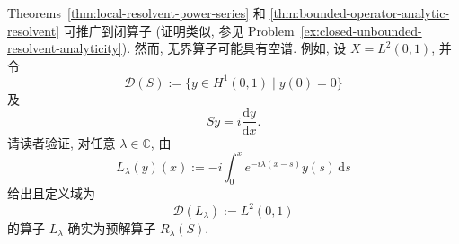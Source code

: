 \begin{Remark}
\label{rem:unbounded-operator-empty-spectrum-example}
Theorems~\ref{thm:local-resolvent-power-series} 和 \ref{thm:bounded-operator-analytic-resolvent} 可推广到闭算子 (证明类似, 参见 Problem~\ref{ex:closed-unbounded-resolvent-analyticity}). 然而, 无界算子可能具有空谱. 例如, 设 $X=L^2(0,1)$, 并令
\begin{equation}\label{eq:empty-spectrum-derivative-domain}
\mathcal{D}(S):=\{y\in H^1(0,1)\mid y(0)=0\}
\end{equation}
及
\begin{equation}\label{eq:empty-spectrum-derivative-action}
Sy=i\dfrac{\mathrm{d}y}{\mathrm{d}x}.
\end{equation}
请读者验证, 对任意 $\lambda\in\mathbb{C}$, 由
\begin{equation}\label{eq:empty-spectrum-derivative-explicit-resolvent}
L_\lambda(y)(x):=-i\int_0^xe^{-i\lambda(x-s)}y(s)\,\mathrm{d}s
\end{equation}
给出且定义域为
\begin{equation}\label{eq:empty-spectrum-derivative-resolvent-domain}
\mathcal{D}(L_\lambda):=L^2(0,1)
\end{equation}
的算子 $L_\lambda$ 确实为预解算子 $R_\lambda(S)$.
\end{Remark}
